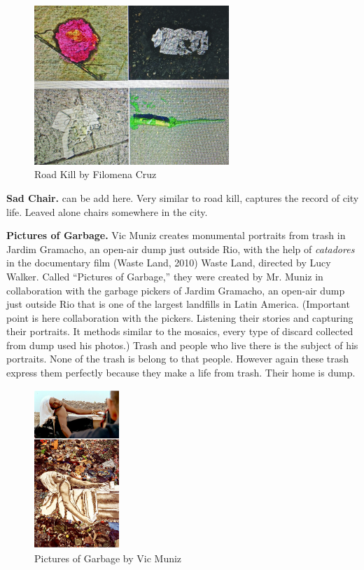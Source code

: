 \begin{figure}[h!]
  \centering
  \includegraphics[height=6cm]{graphics/FilomenaCruz_RoadKill_ReVista.jpg}
  \caption{Road Kill by Filomena Cruz}
  \label{fig:FilomenaCruz_RoadKill_ReVista}
\end{figure}






%
%
\textbf{Sad Chair.} can be add here. Very similar to road kill, captures the record of city life. Leaved alone chairs somewhere in the city. 





%
%
\textbf{Pictures of Garbage.} Vic Muniz creates monumental portraits from trash in Jardim Gramacho, an open-air dump just outside Rio, with the help of \textit{catadores} in the documentary film (Waste Land, 2010) Waste Land, directed by Lucy Walker. Called “Pictures of Garbage,” they were created by Mr. Muniz in collaboration with the garbage pickers of Jardim Gramacho, an open-air dump just outside Rio that is one of the largest landfills in Latin America. (Important point is here collaboration with the pickers. Listening their stories and capturing their portraits. It methods similar to the mosaics, every type of discard collected from dump used his photos.) Trash and people who live there is the subject of his portraits. None of the trash is belong to that people. However again these trash express them perfectly because they make a life from trash. Their home is dump.

\begin{figure}[h!]
  \centering
  \includegraphics[height=6cm]{graphics/vik-muniz-picturesofgarbage0.jpg}
  \caption{Pictures of Garbage by Vic Muniz}
  \label{fig:VicMuniz_PicturesOfGarbage}
\end{figure}





